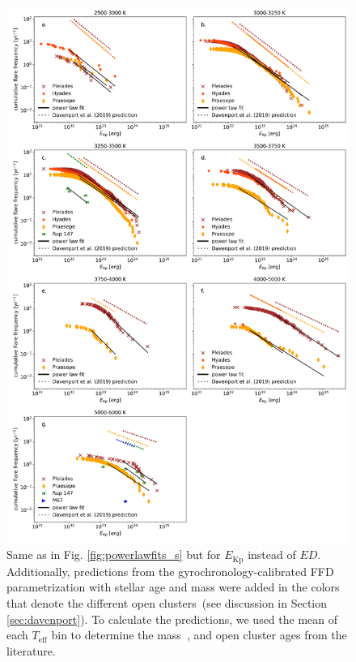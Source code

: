 \documentclass{aa}
\begin{document}
\begin{figure}[ht!]
    \centering
    \includegraphics[width=14.5cm]{pics/FFDs/SpT_wise_sample_ffd_energy_wheatland.png}
    \caption{Same as in Fig. \ref{fig:powerlawfits_s} but for $E_\mathrm{Kp}$ instead of $ED$. Additionally, predictions from the \citet{davenport2019} gyrochronology-calibrated FFD parametrization with stellar age and mass were added in the colors that denote the different open clusters~(see discussion in Section \ref{sec:davenport}). To calculate the predictions, we used the mean of each $T_\mathrm{eff}$ bin to determine the mass~\citep{pecaut_intrinsic_2013}, and open cluster ages from the literature.}        	
    \label{fig:powerlawfits_erg}
\end{figure}
\end{document}
